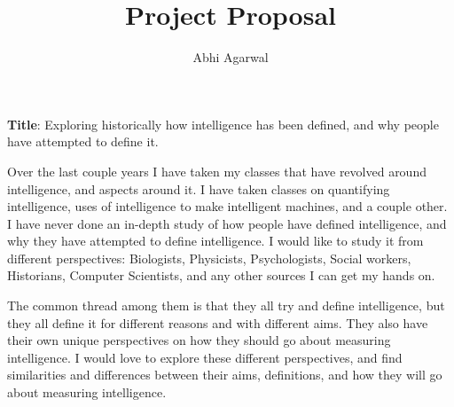 \documentclass[11pt, oneside]{article}
\title{Project Proposal\vspace{-0.4cm}}
\author{Abhi Agarwal\vspace{-1cm}}
\date{}
\begin{document}
\maketitle

\noindent \textbf{Title}: Exploring historically how intelligence has been defined, and why people have attempted to define it.

\par Over the last couple years I have taken my classes that have revolved around intelligence, and aspects around it. I have taken classes on quantifying intelligence, uses of intelligence to make intelligent machines, and a couple other. I have never done an in-depth study of how people have defined intelligence, and why they have attempted to define intelligence. I would like to study it from different perspectives: Biologists, Physicists, Psychologists, Social workers, Historians, Computer Scientists, and any other sources I can get my hands on.

\par The common thread among them is that they all try and define intelligence, but they all define it for different reasons and with different aims. They also have their own unique perspectives on how they should go about measuring intelligence. I would love to explore these different perspectives, and find similarities and differences between their aims, definitions, and how they will go about measuring intelligence.
\end{document}
